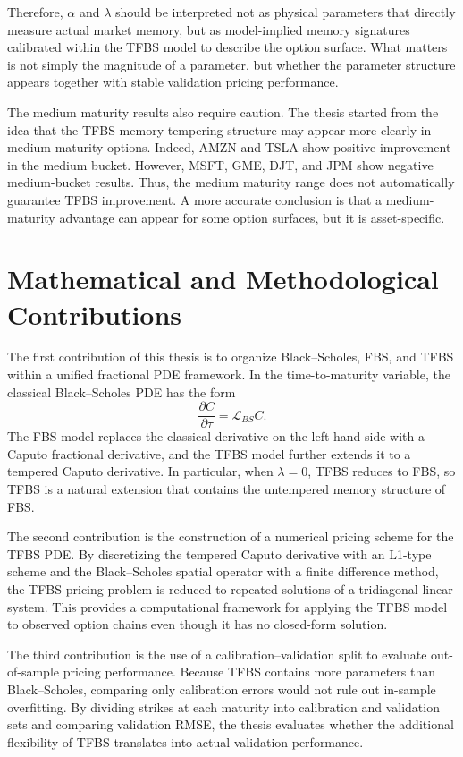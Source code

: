 \documentclass[11pt,a4paper]{report}
\begin{document}
Therefore, $\alpha$ and $\lambda$ should be interpreted not as physical parameters that directly measure actual market memory, but as model-implied memory signatures calibrated within the TFBS model to describe the option surface. What matters is not simply the magnitude of a parameter, but whether the parameter structure appears together with stable validation pricing performance.

The medium maturity results also require caution. The thesis started from the idea that the TFBS memory-tempering structure may appear more clearly in medium maturity options. Indeed, AMZN and TSLA show positive improvement in the medium bucket. However, MSFT, GME, DJT, and JPM show negative medium-bucket results. Thus, the medium maturity range does not automatically guarantee TFBS improvement. A more accurate conclusion is that a medium-maturity advantage can appear for some option surfaces, but it is asset-specific.

\section{Mathematical and Methodological Contributions}

The first contribution of this thesis is to organize Black--Scholes, FBS, and TFBS within a unified fractional PDE framework. In the time-to-maturity variable, the classical Black--Scholes PDE has the form
\[
\frac{\partial C}{\partial \tau}
=
\mathcal{L}_{BS}C.
\]
The FBS model replaces the classical derivative on the left-hand side with a Caputo fractional derivative, and the TFBS model further extends it to a tempered Caputo derivative. In particular, when $\lambda=0$, TFBS reduces to FBS, so TFBS is a natural extension that contains the untempered memory structure of FBS.

The second contribution is the construction of a numerical pricing scheme for the TFBS PDE. By discretizing the tempered Caputo derivative with an L1-type scheme and the Black--Scholes spatial operator with a finite difference method, the TFBS pricing problem is reduced to repeated solutions of a tridiagonal linear system. This provides a computational framework for applying the TFBS model to observed option chains even though it has no closed-form solution.

The third contribution is the use of a calibration--validation split to evaluate out-of-sample pricing performance. Because TFBS contains more parameters than Black--Scholes, comparing only calibration errors would not rule out in-sample overfitting. By dividing strikes at each maturity into calibration and validation sets and comparing validation RMSE, the thesis evaluates whether the additional flexibility of TFBS translates into actual validation performance.
\end{document}
